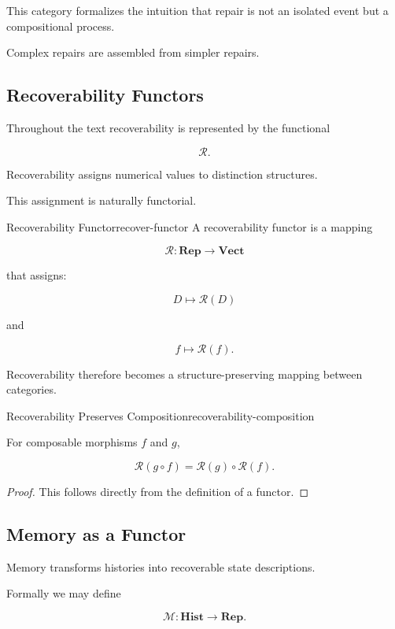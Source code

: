 \documentclass[12pt,twoside,openright]{book}
\begin{document}
This category formalizes the intuition that repair is not
an isolated event but a compositional process.

Complex repairs are assembled from simpler repairs.

\subsection{Recoverability Functors}

Throughout the text recoverability is represented by the
functional

\[
\mathcal R.
\]

Recoverability assigns numerical values to distinction
structures.

This assignment is naturally functorial.

\begin{definition}{Recoverability Functor}{recover-functor}
A recoverability functor is a mapping

\[
\mathcal R:
\mathbf{Rep}
\rightarrow
\mathbf{Vect}
\]

that assigns:

\[
D
\mapsto
\mathcal R(D)
\]

and

\[
f
\mapsto
\mathcal R(f).
\]
\end{definition}

Recoverability therefore becomes a structure-preserving
mapping between categories.

\begin{proposition}{Recoverability Preserves Composition}{recoverability-composition}

For composable morphisms \(f\) and \(g\),

\[
\mathcal R(g\circ f)
=

\mathcal R(g)\circ\mathcal R(f).
\]
\end{proposition}

\begin{proof}
This follows directly from the definition of a functor.
\end{proof}

\subsection{Memory as a Functor}

Memory transforms histories into recoverable state
descriptions.

Formally we may define

\[
\mathcal M:
\mathbf{Hist}
\rightarrow
\mathbf{Rep}.
\]
\end{document}
